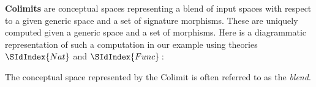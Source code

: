 {\bf Colimits} are conceptual spaces representing a blend of input
spaces with respect to a given generic space and a set of signature
morphisms. These are uniquely computed given a generic space and a set of
morphisms. Here is a diagrammatic representation of such a computation
in our example using theories $\SIdIndex{Nat}$ and $\SIdIndex{Func}:$
\begin{center}
\end{center}
The conceptual space represented by the Colimit is often referred to
as the {\em blend}. 

